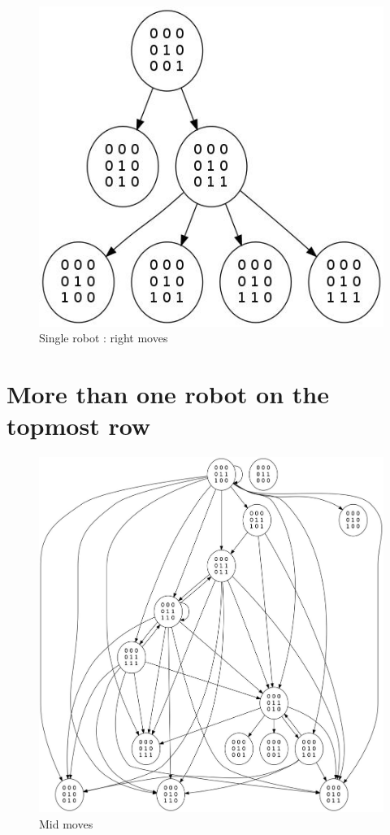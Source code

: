 \documentclass[11pt, a4paper]{article}
\theoremstyle{plain}
\theoremstyle{definition}
\theoremstyle{remark}
\begin{document}
\begin{figure}
\includegraphics[scale=0.50]{graph_images/graph_single_right.jpg}
\caption{Single robot : right moves}
\label{graph:right}
\end{figure}

\section{More than one robot on the topmost row}

\begin{figure}
\includegraphics[scale=0.40]{graph_images/graph_leftmost_mid.jpg}
\caption{Mid moves}
\label{graph:leftmost_mid}
\end{figure}
\end{document}
